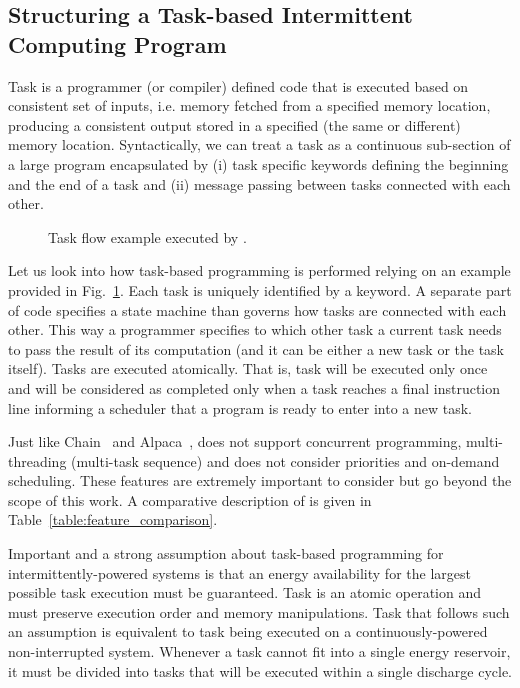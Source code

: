 \subsection{Structuring a Task-based Intermittent Computing Program}

 Task is a programmer (or compiler) defined code that is executed based on consistent set of inputs, i.e. memory fetched from a specified memory location, producing a consistent output stored in a specified (the same or different) memory location. Syntactically, we can treat a task as a continuous sub-section of a large program encapsulated by (i) task specific keywords defining the beginning and the end of a task and (ii) message passing between tasks connected with each other.

\begin{figure}
	\centering
	\caption{Task flow example executed by \sys.}
	\label{fig:task_flow_example}
\end{figure}

Let us look into how task-based programming is performed relying on an example provided in Fig.~\ref{fig:task_flow_example}. Each task is uniquely identified by a keyword. A separate part of code specifies a state machine than governs how tasks are connected with each other. This way a programmer specifies to which other task a current task needs to pass the result of its computation (and it can be either a new task or the task itself). Tasks are executed atomically. That is, task will be executed only once and will be considered as completed only when a task reaches a final instruction line informing a scheduler that a program is ready to enter into a new task.

Just like Chain~\cite{chain} and Alpaca~\cite{alpaca}, \sys does not support concurrent programming, multi-threading (multi-task sequence) and does not consider priorities and on-demand scheduling. These features are extremely important to consider but go beyond the scope of this work. A comparative description of \sys is given in Table~\ref{table:feature_comparison}. 

Important and a strong assumption about task-based programming for intermittently-powered systems is that an energy availability for the largest possible task execution must be guaranteed. Task is an atomic operation and must preserve execution order and memory manipulations. Task that follows such an assumption is equivalent to task being executed on a continuously-powered non-interrupted system. Whenever a task cannot fit into a single energy reservoir, it must be divided into tasks that will be executed within a single discharge cycle.

